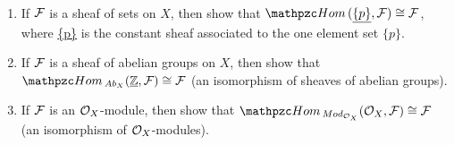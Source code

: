  \begin{exr}\label{chap2exr:OX-moduel-hom_from_special_Ox-modules}\ 
 \begin{enumerate}[label=(\alph*)]
 	\item
If ${\cal F}$ is a sheaf of sets on $X$, then show that $\phom(\underline{\{p\}},\calf) \cong \calf$, where \underline{\{p\}} is the constant sheaf associated to the one element set $\{p\}$.
\item 
 If ${\cal F}$ is a sheaf of abelian groups on $X$, then show that $\phom_{Ab_X}(\underline{\intg},\calf)\cong \calf$ (an isomorphism of sheaves of abelian groups).
\item  If ${\cal F}$ is an ${\cal O}_X$-module, then show that $\phom_{Mod_{\calo_X}}(\calo_X,\calf) \cong\calf$ (an isomorphism of ${\cal O}_X$-modules).
\end{enumerate}
 \end{exr}
